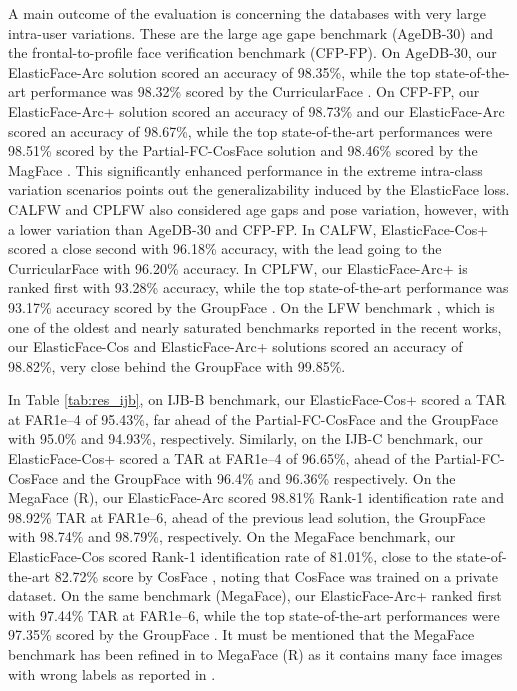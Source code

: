 \documentclass[letterpaper, 10 pt, conference]{ieeeconf}  \usepackage{times}
\begin{document}
A main outcome of the evaluation is concerning the databases with very large intra-user variations. These are the large age gape benchmark (AgeDB-30) and the frontal-to-profile face verification benchmark (CFP-FP). On AgeDB-30, our ElasticFace-Arc solution scored an accuracy of 98.35\%, while the top state-of-the-art performance was 98.32\% scored by the CurricularFace \cite{curricularface}.  On CFP-FP, our ElasticFace-Arc+ solution scored an accuracy of 98.73\% and our ElasticFace-Arc scored an accuracy of 98.67\%, while the top state-of-the-art performances were 98.51\% scored by the Partial-FC-CosFace \cite{an2020partical_fc} 
solution and 98.46\% scored by the MagFace \cite{magface}. This significantly enhanced performance in the extreme intra-class variation scenarios points out the generalizability induced by the ElasticFace loss.
CALFW and CPLFW also considered age gaps and pose variation, however, with a lower variation than AgeDB-30 and CFP-FP. 
In CALFW, ElasticFace-Cos+ scored a close second with 96.18\% accuracy, with the lead going to the CurricularFace \cite{curricularface} with 96.20\% accuracy. In CPLFW, our ElasticFace-Arc+ is ranked first with 93.28\% accuracy, while the top state-of-the-art performance was 93.17\% accuracy scored by the GroupFace \cite{groupface}.
On the LFW benchmark \cite{LFWTech}, which is one of the oldest and nearly saturated benchmarks reported in the recent works, our ElasticFace-Cos and ElasticFace-Arc+ solutions scored an accuracy of 98.82\%, very close behind the GroupFace \cite{groupface} with 99.85\%. 

In Table \ref{tab:res_ijb}, on IJB-B benchmark, our ElasticFace-Cos+ scored a TAR at FAR1e–4 of 95.43\%, far ahead of the Partial-FC-CosFace \cite{an2020partical_fc} and the GroupFace \cite{groupface} with 95.0\% and 94.93\%, respectively. 
Similarly, on the IJB-C benchmark, our ElasticFace-Cos+ scored a TAR at FAR1e–4 of 96.65\%,  ahead of the Partial-FC-CosFace \cite{an2020partical_fc} and the GroupFace \cite{groupface} with 96.4\% and 96.36\% respectively. 
On the MegaFace (R), our ElasticFace-Arc scored 98.81\% Rank-1 identification rate and 98.92\% TAR at FAR1e–6, ahead of the previous lead solution, the GroupFace \cite{groupface} with 98.74\% and 98.79\%, respectively. 
On the MegaFace benchmark, our ElasticFace-Cos scored Rank-1 identification rate of 81.01\%, close to the state-of-the-art 82.72\% score by CosFace \cite{DBLP:conf/cvpr/WangWZJGZL018}, noting that CosFace was trained on a private dataset. On the same benchmark (MegaFace), our ElasticFace-Arc+ ranked first with 97.44\% TAR at FAR1e–6, while the top state-of-the-art performances were 97.35\% scored by the GroupFace \cite{groupface}.
It must be mentioned that the MegaFace benchmark has been refined in \cite{deng2019arcface} to MegaFace (R) as it contains many face images with wrong labels as reported in \cite{deng2019arcface}.
\end{document}
